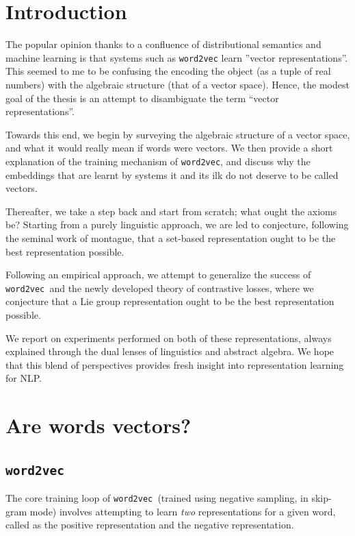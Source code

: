 \documentclass{book}
\newcommand{\wtov}{\texttt{word2vec }}
\begin{document}
\tableofcontents
\chapter{Introduction}

The popular opinion thanks to a confluence of distributional semantics
and machine learning is that systems such as \texttt{word2vec} learn
''vector representations''. This seemed to me to be confusing the encoding
the object (as a tuple of real numbers) with the algebraic structure
(that of a vector space). Hence, the modest goal of the thesis is an
attempt to disambiguate the term ``vector representations''.

Towards this end, we begin by surveying the algebraic structure of a vector
space, and what it would really mean if words were vectors. We then provide
a short explanation of the training mechanism of \texttt{word2vec}, and
discuss why the embeddings that are learnt by systems it and its ilk do not
deserve to be called vectors. 

Thereafter, we take a step back and start from scratch; what ought the axioms
be? Starting from a purely linguistic approach, we are led to conjecture, following
the seminal work of montague, that a set-based representation ought to be
the best representation possible.

Following an empirical approach, we attempt to generalize the success
of \wtov and the newly developed theory of contrastive losses, where we conjecture
that a Lie group representation ought to be the best representation possible.

We report on experiments performed on both of these representations, always
explained through the dual lenses of linguistics and abstract algebra. We hope
that this blend of perspectives provides fresh insight into representation
learning for NLP.

\chapter{Are words vectors?}

\section{\wtov}

The core training loop of \wtov (trained using negative sampling, in skip-gram
mode) involves attempting to learn \emph{two} representations for a given word,
called as the positive representation and the negative representation.
\end{document}
